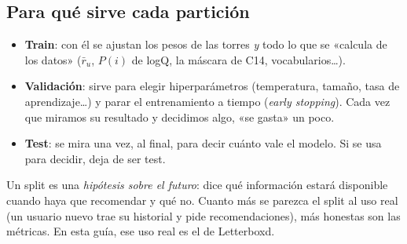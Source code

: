 \documentclass[a4paper,11pt]{article}
\begin{document}
\subsection{Para qué sirve cada partición}
\begin{itemize}
  \item \textbf{Train}: con él se ajustan los pesos de las torres \emph{y} todo lo que se «calcula de los datos»
        ($\bar r_u$, $P(i)$ de logQ, la máscara de C14, vocabularios\dots).
  \item \textbf{Validación}: sirve para elegir hiperparámetros (temperatura, tamaño, tasa de aprendizaje\dots) y parar
        el entrenamiento a tiempo (\emph{early stopping}). Cada vez que miramos su resultado y decidimos algo, «se
        gasta» un poco.
  \item \textbf{Test}: se mira una vez, al final, para decir cuánto vale el modelo. Si se usa para decidir, deja de
        ser test.
\end{itemize}

\begin{idea}
Un split es una \emph{hipótesis sobre el futuro}: dice qué información estará disponible cuando haya que recomendar y
qué no. Cuanto más se parezca el split al uso real (un usuario nuevo trae su historial y pide recomendaciones), más
honestas son las métricas. En esta guía, ese uso real es el de Letterboxd.
\end{idea}
\end{document}
